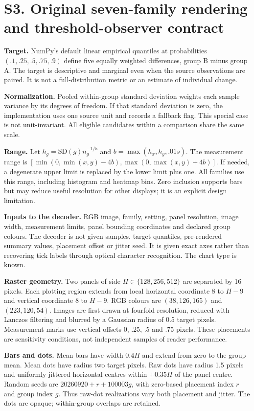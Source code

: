 \documentclass[10pt]{article}
\begin{document}
\section*{S3. Original seven-family rendering and threshold-observer contract}
\textbf{Target.} NumPy's default linear empirical quantiles at probabilities $(.1,.25,.5,.75,.9)$ define five equally weighted differences, group B minus group A. The target is descriptive and marginal even when the source observations are paired. It is not a full-distribution metric or an estimate of individual change.

\textbf{Normalization.} Pooled within-group standard deviation weights each sample variance by its degrees of freedom. If that standard deviation is zero, the implementation uses one source unit and records a fallback flag. This special case is not unit-invariant. All eligible candidates within a comparison share the same scale.

\textbf{Range.} Let $h_g=\mathrm{SD}(g)n_g^{-1/5}$ and $b=\max(h_x,h_y,.01s)$. The measurement range is $[\min(0,\min(x,y)-4b),\max(0,\max(x,y)+4b)]$. If needed, a degenerate upper limit is replaced by the lower limit plus one. All families use this range, including histogram and heatmap bins. Zero inclusion supports bars but may reduce useful resolution for other displays; it is an explicit design limitation.

\textbf{Inputs to the decoder.} RGB image, family, setting, panel resolution, image width, measurement limits, panel bounding coordinates and declared group colours. The decoder is not given samples, target quantiles, pre-rendered summary values, placement offset or jitter seed. It is given exact axes rather than recovering tick labels through optical character recognition. The chart type is known.

\textbf{Raster geometry.} Two panels of side $H\in\{128,256,512\}$ are separated by 16 pixels. Each plotting region extends from local horizontal coordinate 8 to $H-9$ and vertical coordinate 8 to $H-9$. RGB colours are $(38,126,165)$ and $(223,120,54)$. Images are first drawn at fourfold resolution, reduced with Lanczos filtering and blurred by a Gaussian radius of 0.5 target pixels. Measurement marks use vertical offsets 0, .25, .5 and .75 pixels. These placements are sensitivity conditions, not independent samples of reader performance.

\textbf{Bars and dots.} Mean bars have width $0.4H$ and extend from zero to the group mean. Mean dots have radius two target pixels. Raw dots have radius 1.5 pixels and uniformly jittered horizontal centres within $\pm0.35H$ of the panel centre. Random seeds are $20260920+r+100003g$, with zero-based placement index $r$ and group index $g$. Thus raw-dot realizations vary both placement and jitter. The dots are opaque; within-group overlaps are retained.
\end{document}
